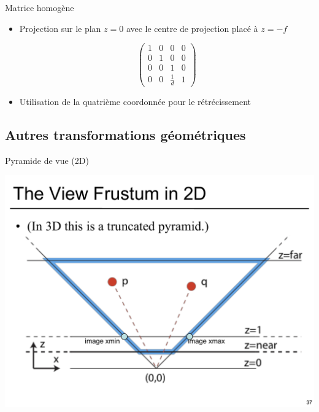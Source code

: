 \begin{frame}{Matrice homogène}
\begin{itemize}
\item Projection sur le plan $z=0$ avec le centre de projection placé à $z=-f$

$$
\left(
\begin{array}{cccc}
1 & 0 & 0 & 0 \\
0 & 1 & 0 & 0 \\
0 & 0 & 1 & 0 \\
0 & 0 & \frac{1}{d} & 1
\end{array}
\right)
$$
\item Utilisation de la quatrième coordonnée pour le rétrécissement
\end{itemize}
\end{frame}

\subsection{Autres transformations géométriques}

\begin{frame}{Pyramide de vue (2D)}
\begin{center}
\includegraphics[height=.6\textheight]{figs/frustum2d.pdf}
\end{center}
\end{frame}


